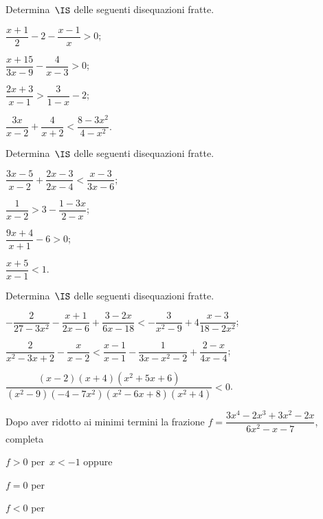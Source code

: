 \begin{esercizio}[\Ast]
\label{ese:18.67}
Determina~$\IS$ delle seguenti disequazioni fratte.
\begin{multicols}{2}
\begin{enumeratea}
\spazielenx
 \item $\dfrac{x+1}{2}-2-\dfrac{x-1}{x}>0$;
\item $\dfrac{x+15}{3x-9}-\dfrac{4}{x-3}>0$;
\item $\dfrac{2x+3}{x-1}>\dfrac{3}{1-x}-2$;
\item $\dfrac{3x}{x-2}+\dfrac{4}{x+2}<\dfrac{8-3x^{2}}{4-x^{2}}$.
\end{enumeratea}
\end{multicols}
\end{esercizio}

\begin{esercizio}[\Ast]
\label{ese:18.68}
Determina~$\IS$ delle seguenti disequazioni fratte.
\begin{multicols}{2}
\begin{enumeratea}
\spazielenx
\item $\dfrac{3x-5}{x-2}+\dfrac{2x-3}{2x-4}<\dfrac{x-3}{3x-6}$;
\item $\dfrac{1}{x-2}>3-\dfrac{1-3x}{2-x}$;
\item $\dfrac{9x+4}{x+1}-6>0$;
\item $\dfrac{x+5}{x-1}<1$.
\end{enumeratea}
\end{multicols}
\end{esercizio}

\begin{esercizio}[\Ast]
\label{ese:18.69}
Determina~$\IS$ delle seguenti disequazioni fratte.

\begin{enumeratea}
 \item $-{\dfrac{2}{27-3x^{2}}}-\dfrac{x+1}{2x-6}+\dfrac{3-2x}{6x-18}<-{\dfrac{3}{x^{2}-9}}+4\dfrac{x-3}{18-2x^{2}}$;
\item $\dfrac{2}{x^{2}-3x+2}-\dfrac{x}{x-2}<\dfrac{x-1}{x-1}-\dfrac{1}{3x-x^{2}-2}+\dfrac{2-x}{4x-4}$;
\item $\dfrac{(x-2)(x+4)(x^{2}+5x+6)}{(x^{2}-9)(-4-7x^{2})(x^{2}-6x+8)(x^{2}+4)}<0$.
\end{enumeratea}
\end{esercizio}

\begin{esercizio}
\label{ese:18.70}
Dopo aver ridotto ai minimi termini la frazione
$f=\dfrac{3x^{4}-2x^{3}+3x^{2}-2x}{6x^{2}-x-7}$, completa

 \begin{enumeratea}
 \item $f>0$ per~$x<-1$ oppure \dotfill
 \item $f=0$ per \dotfill
 \item $f<0$ per \dotfill
 \end{enumeratea}
\end{esercizio}

